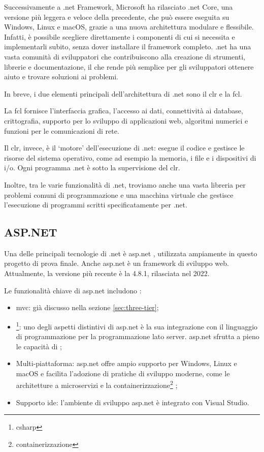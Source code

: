 Successivamente a \gls{.net} Framework, Microsoft ha rilasciato \gls{.net} Core, una versione più leggera e veloce della precedente, che può essere eseguita su Windows, Linux e macOS, grazie a una nuova architettura modulare e flessibile. Infatti, è possibile scegliere direttamente i componenti di cui si necessita e implementarli subito, senza dover installare il \gls{framework} completo. \gls{.net} ha una vasta comunità di sviluppatori che contribuiscono alla creazione di strumenti, librerie e documentazione, il che rende più semplice per gli sviluppatori ottenere aiuto e trovare soluzioni ai problemi.

In breve, i due elementi principali dell'architettura di \gls{.net} sono il \acrfull{clr} e la \acrfull{fcl}.

La \acrshort{fcl} fornisce l'interfaccia grafica, l'accesso ai dati, connettività ai database, crittografia, supporto per lo sviluppo di applicazioni web, algoritmi numerici e funzioni per le comunicazioni di rete.

Il \acrshort{clr}, invece, è il `motore' dell'esecuzione di \gls{.net}: esegue il codice e gestisce le risorse del sistema operativo, come ad esempio la memoria, i file e i dispositivi di \acrshort{i/o}. Ogni programma \gls{.net} è sotto la supervisione del \acrshort{clr}.

Inoltre, tra le varie funzionalità di \gls{.net}, troviamo anche una vasta libreria per problemi comuni di programmazione e una macchina virtuale che gestisce l'esecuzione di programmi scritti specificatamente per \gls{.net}. 


\subsection{ASP.NET}\label{sec:asp.net}
Una delle principali tecnologie di \gls{.net} è \acrfull{asp.net} \cite{asp.net}, utilizzata ampiamente in questo progetto di prova finale. 
Anche \acrshort{asp.net} è un \gls{framework} di sviluppo web. Attualmente, la versione più recente è la 4.8.1, rilasciata nel 2022. \cite{asp.netWiki}

Le funzionalità chiave di \acrshort{asp.net} includono \cite{asp.netDocs}:
\begin{itemize}
    \item \acrfull{mvc}: già discusso nella sezione \ref{sec:three-tier};
    \item {}\footnote{\glsdesc{csharp}}: uno degli aspetti distintivi di \acrshort{asp.net} è la sua integrazione con il linguaggio di programmazione  per la programmazione lato server. \acrshort{asp.net} sfrutta a pieno le capacità di ;
    \item Multi-piattaforma: \acrshort{asp.net} offre ampio supporto per Windows, Linux e macOS e facilita l'adozione di pratiche di sviluppo moderne, come le architetture a microservizi e la containerizzazione\footnote{\glsdesc{containerizzazione}} \cite{asp.netCore};
    \item Supporto \acrfull{ide}: l'ambiente di sviluppo \acrshort{asp.net} è integrato con Visual Studio.
\end{itemize}

